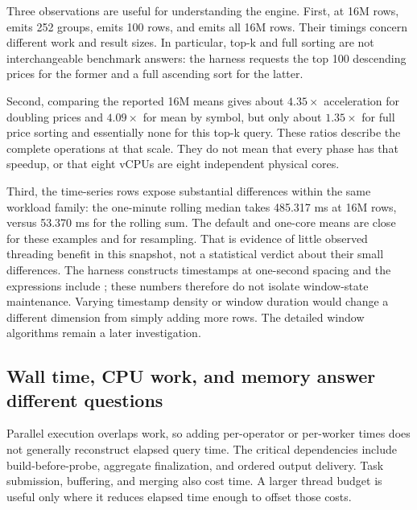 Three observations are useful for understanding the engine. First, at 16M
rows,  emits 252 groups,  emits
100 rows, and  emits all 16M rows. Their timings concern
different work and result sizes. In particular, top-k and full sorting are
not interchangeable benchmark answers: the harness requests the top 100
descending prices for the former and a full ascending sort for the latter.

Second, comparing the reported 16M means gives about $4.35\times$ acceleration
for doubling prices and $4.09\times$ for mean by symbol, but only about
$1.35\times$ for full price sorting and essentially none for this top-k
query. These ratios describe the complete operations at that scale. They do
not mean that every phase has that speedup, or that eight vCPUs are eight
independent physical cores.

Third, the time-series rows expose substantial differences within the same
workload family: the one-minute rolling median takes 485.317 ms at 16M rows,
versus 53.370 ms for the rolling sum. The default and one-core means are close
for these examples and for resampling. That is evidence of little observed
threading benefit in this snapshot, not a statistical verdict about their
small differences. The harness constructs timestamps at one-second spacing
and the expressions include ; these numbers therefore do
not isolate window-state maintenance. Varying timestamp density or window
duration would change a different dimension from simply adding more rows.
The detailed window algorithms remain a later investigation.


\subsection{Wall time, CPU work, and memory answer different questions}
Parallel execution overlaps work, so adding per-operator or per-worker times
does not generally reconstruct elapsed query time. The critical dependencies
include build-before-probe, aggregate finalization, and ordered output delivery.
Task submission, buffering, and merging also cost time. A larger thread budget
is useful only where it reduces elapsed time enough to offset those costs.

